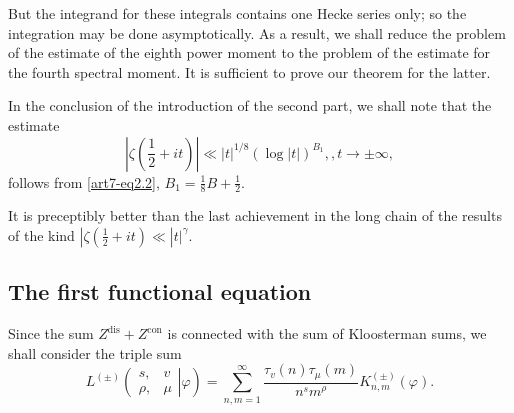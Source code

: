 But the integrand for these integrals contains one Hecke series only; so the integration may be done asymptotically. As a result, we shall reduce the problem of the estimate of the eighth power moment to the problem of the estimate for the fourth spectral moment. It is sufficient to prove  our theorem for the latter. 

In the conclusion of the introduction of the second part, we shall note that the estimate 
$$
|\zeta(\frac{1}{2} + it)| \ll  |t|^{1/8} (\log |t|)^{B_1} ,, t \to \pm \infty, 
$$
follows from \eqref{art7-eq2.2}, $B_1 = \frac{1}{8} B + \frac{1}{2}$.

It is preceptibly better than the last achievement in the long chain of the results of the kind $|\zeta(\frac{1}{2} + it) \ll |t|^\gamma$.


\subsection{The first functional equation}\label{art7-subsec2.2}\pageoriginale
Since the sum $Z^{\text{dis}} + Z^{\text{con}}$ is connected with the sum of Kloosterman sums, we shall consider the triple sum 
\setcounter{section}{3}
\setcounter{equation}{0}
\begin{equation}
L^{(\pm)} 
\left( 
\left. 
\begin{matrix}
s, & v \\
\rho, & \mu 
\end{matrix}
\right| \varphi 
\right) = \sum\limits^\infty_{n, m=1} 
\frac{\tau_v (n) \tau_\mu (m)}{n^s m^\rho} K^{(\pm)}_{n,m} (\varphi).
\label{art7-eq3.1}
\end{equation}

